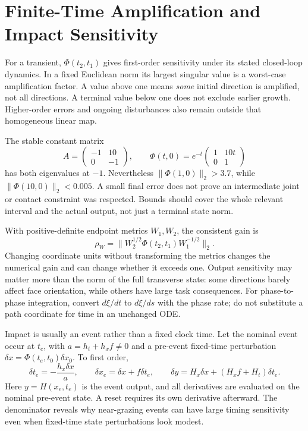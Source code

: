 \section{Finite-Time Amplification and Impact Sensitivity}

For a transient, $\Phi(t_2,t_1)$ gives first-order sensitivity under its stated
closed-loop dynamics. In a fixed Euclidean norm its largest singular value
is a worst-case amplification factor. A value above one means \emph{some}
initial direction is amplified, not all directions. A terminal value below
one does not exclude earlier growth. Higher-order errors and ongoing
disturbances also remain outside that homogeneous linear map.

The stable constant matrix
\begin{equation}\label{eq:orbital_transient_growth}
 A=\begin{pmatrix}-1&10\\0&-1\end{pmatrix},\qquad
 \Phi(t,0)=e^{-t}\begin{pmatrix}1&10t\\0&1\end{pmatrix}
\end{equation}
has both eigenvalues at $-1$. Nevertheless $\|\Phi(1,0)\|_2>3.7$, while
$\|\Phi(10,0)\|_2<0.005$. A small final error does not prove an intermediate
joint or contact constraint was respected. Bounds should cover the whole
relevant interval and the actual output, not just a terminal state norm.

With positive-definite endpoint metrics $W_1,W_2$, the consistent gain is
\begin{equation}\label{eq:amplification}
 \rho_W=\|W_2^{1/2}\Phi(t_2,t_1)W_1^{-1/2}\|_2.
\end{equation}
Changing coordinate units without transforming the metrics changes the
numerical gain and can change whether it exceeds one. Output sensitivity
may matter more than the norm of the full transverse state: some directions
barely affect face orientation, while others have large task consequences.
For phase-to-phase integration, convert $d\xi/dt$ to $d\xi/ds$ with the
phase rate; do not substitute a path coordinate for time in an unchanged ODE.

Impact is usually an event rather than a fixed clock time. Let the nominal
event occur at $t_e$, with $a=h_t+h_xf\ne0$ and a pre-event fixed-time
perturbation $\delta x=\Phi(t_e,t_0)\delta x_0$. To first order,
\begin{equation}\label{eq:orbital_event_sensitivity}
 \delta t_e=-\frac{h_x\delta x}{a},\qquad
 \delta x_e=\delta x+f\delta t_e,\qquad
 \delta y=H_x\delta x+(H_xf+H_t)\delta t_e.
\end{equation}
Here $y=H(x_e,t_e)$ is the event output, and all derivatives are evaluated
on the nominal pre-event state. A reset requires its own derivative afterward.
The denominator reveals why near-grazing events can have large timing
sensitivity even when fixed-time state perturbations look modest.

